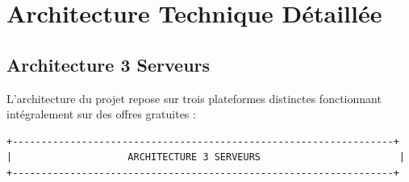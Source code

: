 \documentclass[12pt,a4paper]{report}
\begin{document}
\chapter{Architecture Technique Détaillée}

\section{Architecture 3 Serveurs}
L'architecture du projet repose sur trois plateformes distinctes fonctionnant intégralement sur des offres gratuites :

\begin{verbatim}
+------------------------------------------------------------------+
|                    ARCHITECTURE 3 SERVEURS                        |
+------------------------------------------------------------------+
                                                                     

\end{verbatim}
\end{document}

